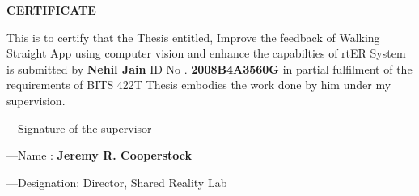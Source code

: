 \begin{center}
\textbf{\large CERTIFICATE}
\end{center}

This is to certify that the Thesis entitled, Improve the feedback of Walking Straight App using computer vision and enhance the capabilties of rtER System  is  submitted by \textbf{Nehil Jain} ID No . \textbf{2008B4A3560G} in partial fulfilment of the requirements of BITS 422T Thesis embodies the work done by him under my supervision.
\begin{flushright}
 ---Signature of the supervisor
\end{flushright} 
\begin{flushright}

 ---Name : \textbf{Jeremy R. Cooperstock}

\end{flushright} 
\begin{flushright}

 ---Designation: Director, Shared Reality Lab

\end{flushright}


